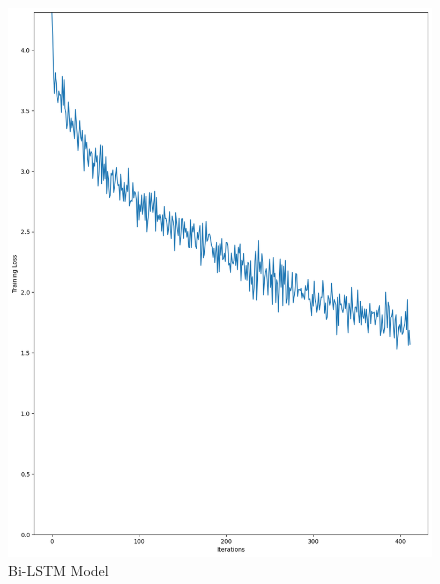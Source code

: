 \documentclass{article}
\begin{document}
\begin{figure}[htbp]
\begin{minipage}[b]{0.2\textwidth}
        \includegraphics[width=\textwidth]{img/LSTMBi_learning.png}
        \caption{Bi-LSTM Model}
        \label{fig:bilstm}
    \end{minipage}
    \hfill
    \begin{minipage}[b]{0.2\textwidth}
        \centering

\end{minipage}
\end{figure}
\end{document}
